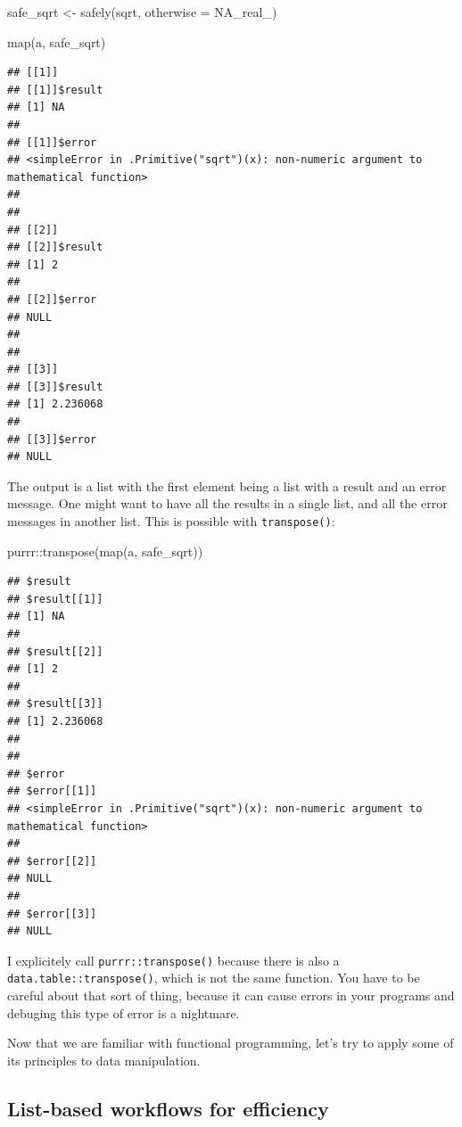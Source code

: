 \documentclass[
]{article}
\newenvironment{Shaded}{\begin{snugshade}}{\end{snugshade}}
\newcommand{\AttributeTok}[1]{\textcolor[rgb]{0.77,0.63,0.00}{#1}}
\newcommand{\ConstantTok}[1]{\textcolor[rgb]{0.00,0.00,0.00}{#1}}
\newcommand{\FunctionTok}[1]{\textcolor[rgb]{0.00,0.00,0.00}{#1}}
\newcommand{\NormalTok}[1]{#1}
\newcommand{\OtherTok}[1]{\textcolor[rgb]{0.56,0.35,0.01}{#1}}
\newcommand{\SpecialCharTok}[1]{\textcolor[rgb]{0.00,0.00,0.00}{#1}}
\begin{document}
\begin{Shaded}
\begin{Highlighting}[]
\NormalTok{safe\_sqrt }\OtherTok{\textless{}{-}} \FunctionTok{safely}\NormalTok{(sqrt, }\AttributeTok{otherwise =} \ConstantTok{NA\_real\_}\NormalTok{)}

\FunctionTok{map}\NormalTok{(a, safe\_sqrt)}
\end{Highlighting}
\end{Shaded}

\begin{verbatim}
## [[1]]
## [[1]]$result
## [1] NA
## 
## [[1]]$error
## <simpleError in .Primitive("sqrt")(x): non-numeric argument to mathematical function>
## 
## 
## [[2]]
## [[2]]$result
## [1] 2
## 
## [[2]]$error
## NULL
## 
## 
## [[3]]
## [[3]]$result
## [1] 2.236068
## 
## [[3]]$error
## NULL
\end{verbatim}

The output is a list with the first element being a list with a result and an error message. One
might want to have all the results in a single list, and all the error messages in another list.
This is possible with \texttt{transpose()}:

\begin{Shaded}
\begin{Highlighting}[]
\NormalTok{purrr}\SpecialCharTok{::}\FunctionTok{transpose}\NormalTok{(}\FunctionTok{map}\NormalTok{(a, safe\_sqrt))}
\end{Highlighting}
\end{Shaded}

\begin{verbatim}
## $result
## $result[[1]]
## [1] NA
## 
## $result[[2]]
## [1] 2
## 
## $result[[3]]
## [1] 2.236068
## 
## 
## $error
## $error[[1]]
## <simpleError in .Primitive("sqrt")(x): non-numeric argument to mathematical function>
## 
## $error[[2]]
## NULL
## 
## $error[[3]]
## NULL
\end{verbatim}

I explicitely call \texttt{purrr::transpose()} because there is also a \texttt{data.table::transpose()}, which
is not the same function. You have to be careful about that sort of thing, because it can cause
errors in your programs and debuging this type of error is a nightmare.

Now that we are familiar with functional programming, let's try to apply some of its principles
to data manipulation.

\hypertarget{list-based-workflows-for-efficiency}{%
\subsection{List-based workflows for efficiency}\label{list-based-workflows-for-efficiency}}
\end{document}
